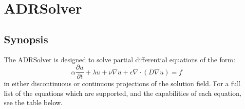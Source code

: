 \section{ADRSolver}


\subsection{Synopsis}

The ADRSolver is designed to solve partial differential equations of the form:
\begin{equation}
\alpha \dfrac{\partial u}{\partial t} + \lambda u + \nu \nabla u + \epsilon \nabla \cdot (D \nabla u) = f
\end{equation}
in either discontinuous or continuous projections of the solution field. 
For a full list of the equations which are supported, and the capabilities of each equation, 
see the table below.

